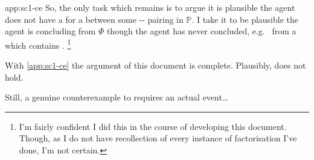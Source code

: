 \begin{note}
\begin{dets}{app:sc1-ce}
  So, the only task which remains is to argue it is plausible the agent does not have a \wit{} for a \ros{} between some -- pairing in \(\mathbb{P}\).
  I take it to be plausible the agent is concluding  from \(\Phi\) though the agent has never concluded, e.g.\  from a \pool{} which contains .%
  \footnote{
    I'm fairly confident I did this in the course of developing this document.
    Though, as I do not have recollection of every instance of factorisation I've done, I'm not certain.
  }%
  \newline
  \end{dets}
\end{note}


\begin{note}
  With \autoref{app:sc1-ce} the argument of this document is complete.
  Plausibly, \issueInclusion{} does not hold.

  Still, a genuine counterexample to \issueInclusion{} requires an actual event\dots
\end{note}

